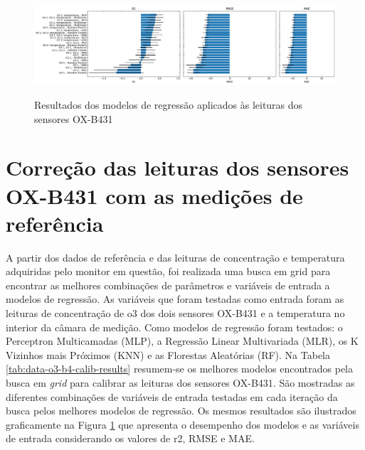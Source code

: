 \begin{figure}[h!]
    \centering
    \caption{Resultados dos modelos de regressão aplicados às leituras dos sensores OX-B431}
    \includegraphics[width=\textwidth]{chapters/4-CALIBRAÇÃO MÚLTIPLOS SENSORES/Figuras/o3-b4-models-performance.png}
    \label{fig:data-o3-b4-models-performance}
\end{figure}

\section{Correção das leituras dos sensores OX-B431 com as medições de referência}

A partir dos dados de referência e das leituras de concentração e temperatura adquiridas pelo monitor em questão, foi realizada uma busca em grid para encontrar as melhores combinações de parâmetros e variáveis de entrada a modelos de regressão. As variáveis que foram testadas como entrada foram as leituras de concentração de \acrshort{o3} dos dois sensores OX-B431 e a temperatura no interior da câmara de medição. Como modelos de regressão foram testados: o Perceptron Multicamadas (MLP), a Regressão Linear Multivariada (MLR), os K Vizinhos mais Próximos (KNN) e as Florestas Aleatórias (RF). Na Tabela \ref{tab:data-o3-b4-calib-results} resumem-se os melhores modelos encontrados pela busca em \textit{grid} para calibrar as leituras dos sensores OX-B431. São mostradas as diferentes combinações de variáveis de entrada testadas em cada iteração da busca pelos melhores modelos de regressão. Os mesmos resultados são ilustrados graficamente na Figura \ref{fig:data-o3-b4-models-performance} que apresenta o desempenho dos modelos e as variáveis de entrada considerando os valores de r2, RMSE e MAE.

